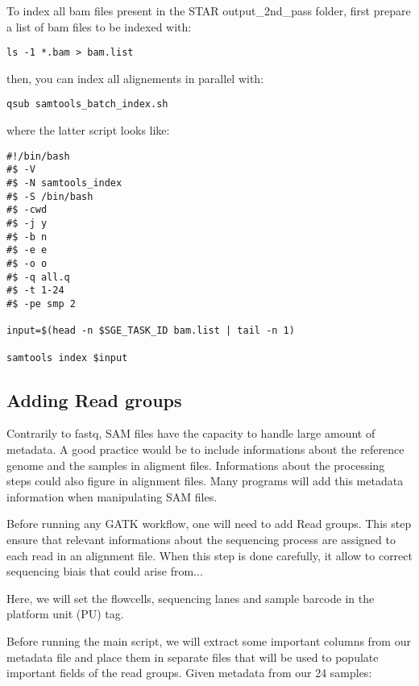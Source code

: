 To index all bam files present in the STAR output_2nd_pass folder, first prepare a list of bam files to be indexed with:

\begin{verbatim}
ls -1 *.bam > bam.list
\end{verbatim}

then, you can index all alignements in parallel with:

\begin{verbatim}
qsub samtools_batch_index.sh
\end{verbatim}

where the latter script looks like:

\begin{verbatim}
#!/bin/bash
#$ -V
#$ -N samtools_index
#$ -S /bin/bash
#$ -cwd
#$ -j y
#$ -b n
#$ -e e
#$ -o o
#$ -q all.q
#$ -t 1-24
#$ -pe smp 2

input=$(head -n $SGE_TASK_ID bam.list | tail -n 1)

samtools index $input
\end{verbatim}





\subsection{Adding Read groups}

Contrarily to fastq, SAM files have the capacity to handle large amount of metadata. A good practice would be to include informations about the reference genome and the samples in aligment files. Informations about the processing steps could also figure in alignment files. Many programs will add this metadata information when manipulating SAM files.


Before running any GATK workflow, one will need to add Read groups. This step ensure that relevant informations about the sequencing process are assigned to each read in an alignment file. When this step is done carefully, it allow to correct sequencing biais that could arise from...


Here, we will set the flowcells, sequencing lanes and sample barcode in the platform unit (PU) tag.

Before running the main script, we will extract some important columns from our metadata file and place them in separate files that will be used to populate important fields of the read groups. Given metadata from our 24 samples:

